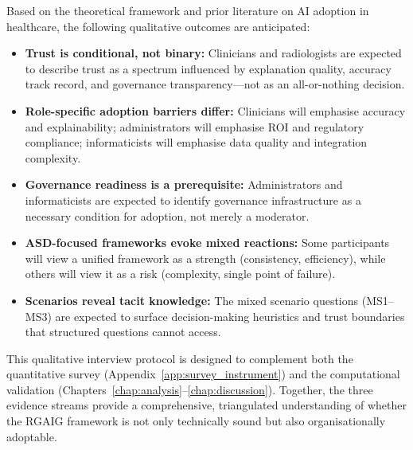 Based on the theoretical framework and prior literature on AI adoption in healthcare, the following qualitative outcomes are anticipated:

\begin{itemize}
    \item \textbf{Trust is conditional, not binary:} Clinicians and radiologists are expected to describe trust as a spectrum influenced by explanation quality, accuracy track record, and governance transparency---not as an all-or-nothing decision.
    \item \textbf{Role-specific adoption barriers differ:} Clinicians will emphasise accuracy and explainability; administrators will emphasise ROI and regulatory compliance; informaticists will emphasise data quality and integration complexity.
    \item \textbf{Governance readiness is a prerequisite:} Administrators and informaticists are expected to identify governance infrastructure as a necessary condition for adoption, not merely a moderator.
    \item \textbf{ASD-focused frameworks evoke mixed reactions:} Some participants will view a unified framework as a strength (consistency, efficiency), while others will view it as a risk (complexity, single point of failure).
    \item \textbf{Scenarios reveal tacit knowledge:} The mixed scenario questions (MS1--MS3) are expected to surface decision-making heuristics and trust boundaries that structured questions cannot access.
\end{itemize}

\noindent This qualitative interview protocol is designed to complement both the quantitative survey (Appendix~\ref{app:survey_instrument}) and the computational validation (Chapters~\ref{chap:analysis}--\ref{chap:discussion}). Together, the three evidence streams provide a comprehensive, triangulated understanding of whether the RGAIG framework is not only technically sound but also organisationally adoptable.

